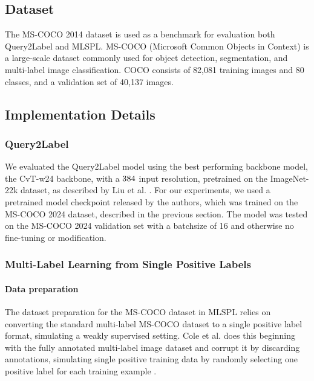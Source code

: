 \documentclass[lettersize,journal]{IEEEtran}
\begin{document}
\subsection{Dataset}
The MS-COCO 2014 \cite{coco14} dataset is used as a benchmark for evaluation both Query2Label and MLSPL. MS-COCO (Microsoft Common Objects in Context) is a large-scale dataset commonly used for object detection, segmentation, and multi-label image classification. COCO consists of 82,081 training images and 80 classes, and a validation set of 40,137 images.

\subsection{Implementation Details}
\subsubsection{Query2Label}
We evaluated the Query2Label model using the best performing backbone model, the CvT-w24 backbone, with a $384\time 384$ input resolution, pretrained on the ImageNet-22k dataset, as described by Liu et al. \cite{Query2Label}. For our experiments, we used a pretrained model checkpoint released by the authors, which was trained on the MS-COCO 2024 dataset, described in the previous section. The model was tested on the MS-COCO 2024 validation set with a batchsize of 16 and otherwise no fine-tuning or modification.


\subsubsection{Multi-Label Learning from Single Positive Labels}
\paragraph{Data preparation}
The dataset preparation for the MS-COCO dataset in MLSPL relies on converting the standard multi-label MS-COCO dataset to a single positive label format, simulating a weakly supervised setting. Cole et al. does this beginning with the fully annotated multi-label image dataset and corrupt it by discarding annotations, simulating single positive training data by randomly selecting one positive label for each training example \cite{mlsp}.
\end{document}
